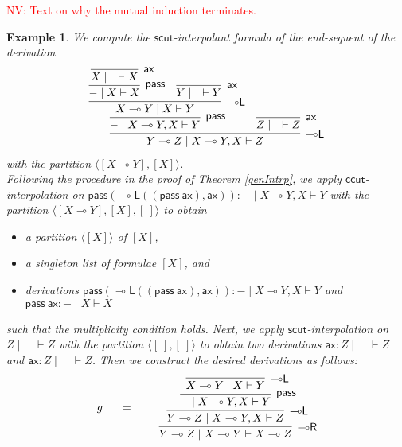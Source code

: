 \documentclass[sn-mathphys-num]{sn-jnl}%
\newcommand{\vd}{\vdash}
\newcommand{\pass}{\mathsf{pass}}
\newcommand{\ax}{\mathsf{ax}}
\newcommand{\lolli}{\multimap}
\newcommand{\lleft}{{\lolli}\mathsf{L}}
\newcommand{\lright}{{\lolli}\mathsf{R}}
\newcommand{\mf}[1]{\mathsf{#1}}
\newcommand{\niccolo}[1]{\textcolor{red}{NV: #1}}
\theoremstyle{thmstyleone}%
\theoremstyle{thmstyletwo}%
\newtheorem{example}[theorem]{Example}%
\theoremstyle{thmstylethree}%
\begin{document}
\niccolo{Text on why the mutual induction terminates.}

\begin{example}
  We compute the $\mf{scut}$-interpolant formula of the end-sequent of the derivation 
  \begin{displaymath}
    \begin{array}{c}
      \infer[\lleft]{Y \lolli Z \mid X \lolli Y , X \vd Z}{
        \infer[\pass]{{-} \mid X \lolli Y ,X \vd Y}{
          \infer[\lleft]{X \lolli Y \mid X \vd Y}{
            \infer[\pass]{{-} \mid X \vd X}{
              \infer[\ax]{X \mid \quad \vd X}{}
            }
            &
            \infer[\ax]{Y \mid \quad \vd Y}{}
          }
        }
        &
        \infer[\ax]{Z \mid \quad \vd Z}{}
      }
    \end{array}
  \end{displaymath}
  with the partition $\langle [X \lolli Y] , [X]\rangle$.
  \\
  Following the procedure in the proof of Theorem \ref{genIntrp}, we apply $\mf{ccut}$-interpolation on $\pass (\lleft ((\pass \ \ax), \ax)) : {-} \mid X \lolli Y , X \vd Y$ with the partition $\langle [X \lolli Y] , [X] , [\ ] \rangle$ to obtain
  \begin{itemize}
    \item[--] a partition $\langle [X] \rangle$ of $[X]$,
    \item[--] a singleton list of formulae $[X]$, and
    \item[--] derivations $\pass (\lleft ((\pass \ \ax), \ax)) : {-} \mid X \lolli Y , X \vd Y$ and $ \pass \ \ax : {-} \mid X \vd X$ 
  \end{itemize}
  such that the multiplicity condition holds.
  Next, we apply $\mf{scut}$-interpolation on $Z \mid \quad \vd Z$ with the partition $\langle [\ ] , [\ ] \rangle$ to obtain two derivations $\ax : Z \mid \quad \vd Z$ and $\ax : Z \mid \quad \vd Z$.
  Then we construct the desired derivations as follows:
  \begin{displaymath}
    \begin{array}{lc}
      \begin{array}{c}
        g
      \end{array}
      \quad
      =&
      \quad
      \begin{array}{c}
        \infer[\lright]{Y \lolli Z \mid X \lolli Y \vd X \lolli Z}{
          \infer[\lleft]{Y \lolli Z \mid X \lolli Y , X \vd Z}{
            \infer[\pass]{{-} \mid X \lolli Y , X \vd Y}{
              \infer[\lleft]{X \lolli Y \mid X \vd Y}{
}}}}
\end{array}
\end{array}
\end{displaymath}
\end{example}
\end{document}
